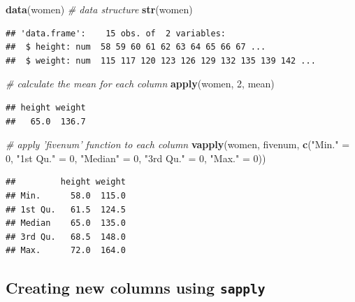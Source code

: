 \documentclass[]{book}
\makeatletter
\newenvironment{Shaded}{\begin{snugshade}}{\end{snugshade}}
\newcommand{\KeywordTok}[1]{\textcolor[rgb]{0.13,0.29,0.53}{\textbf{#1}}}
\newcommand{\DecValTok}[1]{\textcolor[rgb]{0.00,0.00,0.81}{#1}}
\newcommand{\StringTok}[1]{\textcolor[rgb]{0.31,0.60,0.02}{#1}}
\newcommand{\CommentTok}[1]{\textcolor[rgb]{0.56,0.35,0.01}{\textit{#1}}}
\newcommand{\NormalTok}[1]{#1}
\newenvironment{kframe}{%
\medskip{}
\setlength{\fboxsep}{.8em}
 \def\at@end@of@kframe{}%
 \ifinner\ifhmode%
  \def\at@end@of@kframe{\end{minipage}}%
  \begin{minipage}{\columnwidth}%
 \fi\fi%
 \def\FrameCommand##1{\hskip\@totalleftmargin \hskip-\fboxsep
 \colorbox{shadecolor}{##1}\hskip-\fboxsep
     \hskip-\linewidth \hskip-\@totalleftmargin \hskip\columnwidth}%
 \MakeFramed {\advance\hsize-\width
   \@totalleftmargin\z@ \linewidth\hsize
   \@setminipage}}%
 {\par\unskip\endMakeFramed%
 \at@end@of@kframe}
\renewenvironment{Shaded}{\begin{kframe}}{\end{kframe}}
\theoremstyle{definition}
\theoremstyle{definition}
\theoremstyle{definition}
\theoremstyle{remark}
\makeatother
\begin{document}
\begin{Shaded}
\begin{Highlighting}[]
\KeywordTok{data}\NormalTok{(women)}
\CommentTok{# data structure}
\KeywordTok{str}\NormalTok{(women)}
\end{Highlighting}
\end{Shaded}

\begin{verbatim}
## 'data.frame':    15 obs. of  2 variables:
##  $ height: num  58 59 60 61 62 63 64 65 66 67 ...
##  $ weight: num  115 117 120 123 126 129 132 135 139 142 ...
\end{verbatim}

\begin{Shaded}
\begin{Highlighting}[]
\CommentTok{# calculate the mean for each column}
\KeywordTok{apply}\NormalTok{(women, }\DecValTok{2}\NormalTok{, mean)}
\end{Highlighting}
\end{Shaded}

\begin{verbatim}
## height weight 
##   65.0  136.7
\end{verbatim}

\begin{Shaded}
\begin{Highlighting}[]
\CommentTok{# apply 'fivenum' function to each column}
\KeywordTok{vapply}\NormalTok{(women, fivenum, }\KeywordTok{c}\NormalTok{(}\StringTok{"Min."}\NormalTok{ =}\StringTok{ }\DecValTok{0}\NormalTok{, }\StringTok{"1st Qu."}\NormalTok{ =}\StringTok{ }\DecValTok{0}\NormalTok{, }\StringTok{"Median"}\NormalTok{ =}\StringTok{ }\DecValTok{0}\NormalTok{, }
                         \StringTok{"3rd Qu."}\NormalTok{ =}\StringTok{ }\DecValTok{0}\NormalTok{, }\StringTok{"Max."}\NormalTok{ =}\StringTok{ }\DecValTok{0}\NormalTok{))}
\end{Highlighting}
\end{Shaded}

\begin{verbatim}
##         height weight
## Min.      58.0  115.0
## 1st Qu.   61.5  124.5
## Median    65.0  135.0
## 3rd Qu.   68.5  148.0
## Max.      72.0  164.0
\end{verbatim}

\subsection{\texorpdfstring{Creating new columns using
\texttt{sapply}}{Creating new columns using sapply}}\label{creating-new-columns-using-sapply}
\end{document}
